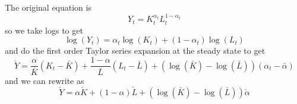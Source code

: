 \documentclass[11pt]{amsart}
\begin{document}
\subsection{}

\subsection{}
The original equation is
\[
Y_t = K_t^{\alpha_t} L_t^{1-\alpha_t}
\]
so we take logs to get
\[
\log(Y_t) = \alpha_t \log(K_t) + (1-\alpha_t) \log(L_t)
\]
and do the first order Taylor series expansion at the steady state to get
\[
\check{Y} =  \frac{\alpha }{\bar{K}} (K_t - \bar{K}) + \frac{1-\alpha }{\bar{L}} (L_t - \bar{L}) + (\log(\bar{K}) - \log(\bar{L})) (\alpha_t - \bar{\alpha})
\]
and we can rewrite as
\[
\check{Y} = \alpha \check{K} + (1-\alpha) \check{L} + (\log(\bar{K}) - \log(\bar{L})) \check{\alpha}
\]
\end{document}
